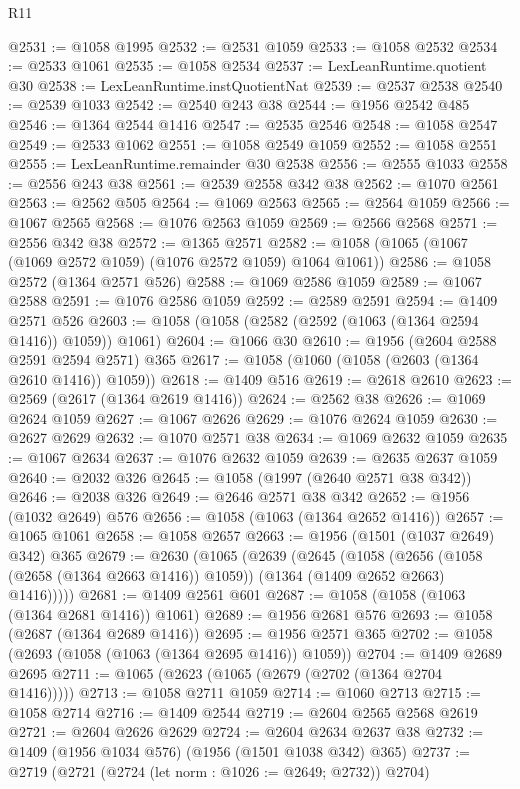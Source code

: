 \begin{lexlean}{R11}
\begin{coremodule}
@2531 := @1058 @1995
@2532 := @2531 @1059
@2533 := @1058 @2532
@2534 := @2533 @1061
@2535 := @1058 @2534
@2537 := LexLeanRuntime.quotient @30
@2538 := LexLeanRuntime.instQuotientNat
@2539 := @2537 @2538
@2540 := @2539 @1033
@2542 := @2540 @243 @38
@2544 := @1956 @2542 @485
@2546 := @1364 @2544 @1416
@2547 := @2535 @2546
@2548 := @1058 @2547
@2549 := @2533 @1062
@2551 := @1058 @2549 @1059
@2552 := @1058 @2551
@2555 := LexLeanRuntime.remainder @30 @2538
@2556 := @2555 @1033
@2558 := @2556 @243 @38
@2561 := @2539 @2558 @342 @38
@2562 := @1070 @2561
@2563 := @2562 @505
@2564 := @1069 @2563
@2565 := @2564 @1059
@2566 := @1067 @2565
@2568 := @1076 @2563 @1059
@2569 := @2566 @2568
@2571 := @2556 @342 @38
@2572 := @1365 @2571
@2582 := @1058 (@1065 (@1067 (@1069 @2572 @1059) (@1076 @2572 @1059) @1064 @1061))
@2586 := @1058 @2572 (@1364 @2571 @526)
@2588 := @1069 @2586 @1059
@2589 := @1067 @2588
@2591 := @1076 @2586 @1059
@2592 := @2589 @2591
@2594 := @1409 @2571 @526
@2603 := @1058 (@1058 (@2582 (@2592 (@1063 (@1364 @2594 @1416)) @1059)) @1061)
@2604 := @1066 @30
@2610 := @1956 (@2604 @2588 @2591 @2594 @2571) @365
@2617 := @1058 (@1060 (@1058 (@2603 (@1364 @2610 @1416)) @1059))
@2618 := @1409 @516
@2619 := @2618 @2610
@2623 := @2569 (@2617 (@1364 @2619 @1416))
@2624 := @2562 @38
@2626 := @1069 @2624 @1059
@2627 := @1067 @2626
@2629 := @1076 @2624 @1059
@2630 := @2627 @2629
@2632 := @1070 @2571 @38
@2634 := @1069 @2632 @1059
@2635 := @1067 @2634
@2637 := @1076 @2632 @1059
@2639 := @2635 @2637 @1059
@2640 := @2032 @326
@2645 := @1058 (@1997 (@2640 @2571 @38 @342))
@2646 := @2038 @326
@2649 := @2646 @2571 @38 @342
@2652 := @1956 (@1032 @2649) @576
@2656 := @1058 (@1063 (@1364 @2652 @1416))
@2657 := @1065 @1061
@2658 := @1058 @2657
@2663 := @1956 (@1501 (@1037 @2649) @342) @365
@2679 := @2630
    (@1065
      (@2639
        (@2645
          (@1058
            (@2656 (@1058 (@2658 (@1364 @2663 @1416)) @1059))
            (@1364 (@1409 @2652 @2663) @1416)))))
@2681 := @1409 @2561 @601
@2687 := @1058 (@1058 (@1063 (@1364 @2681 @1416)) @1061)
@2689 := @1956 @2681 @576
@2693 := @1058 (@2687 (@1364 @2689 @1416))
@2695 := @1956 @2571 @365
@2702 := @1058 (@2693 (@1058 (@1063 (@1364 @2695 @1416)) @1059))
@2704 := @1409 @2689 @2695
@2711 := @1065 (@2623 (@1065 (@2679 (@2702 (@1364 @2704 @1416)))))
@2713 := @1058 @2711 @1059
@2714 := @1060 @2713
@2715 := @1058 @2714
@2716 := @1409 @2544
@2719 := @2604 @2565 @2568 @2619
@2721 := @2604 @2626 @2629
@2724 := @2604 @2634 @2637 @38
@2732 := @1409 (@1956 @1034 @576) (@1956 (@1501 @1038 @342) @365)
@2737 := @2719 (@2721 (@2724 (let norm : @1026 := @2649; @2732)) @2704)

\end{coremodule}
\end{lexlean}
